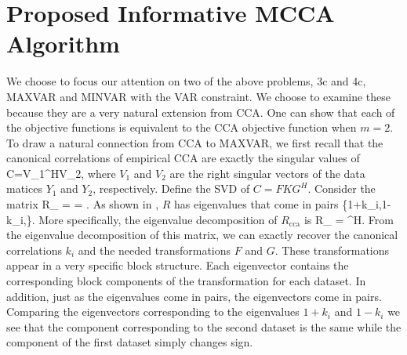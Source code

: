 \section{Proposed Informative MCCA Algorithm}

We choose to focus our attention on two of the above problems, 3c and 4c, MAXVAR and
MINVAR with the VAR constraint. We choose to examine these because they are a very natural
extension from CCA. One can show that each of the objective functions is equivalent to the
CCA objective function when $m=2$. To draw a natural connection from CCA to MAXVAR, we
first recall that the canonical correlations of empirical CCA are exactly the singular
values of 
\beq\label{eq:chpt10:C_cca}
C=V_1^HV_2,
\eeq
where $V_1$ and $V_2$ are the right singular vectors of the data matices $Y_1$ and $Y_2$,
respectively. Define the SVD of $C=FKG^H$. Consider the matrix 
\beq\label{eq:chpt10:R_cca}
R_{} = \left[\begin{array}{c}V_1^H\\V_2^H\end{array}\right]\left[\begin{array}{cc}V_1 &
    V_2\end{array}\right] = \left[\begin{array}{cc}I_{d_1} &
    V_1^HV_2\\ V_2^HV_1 & I_{d_2}\end{array}\right].
\eeq
As shown in \cite{bach2003kernel}, $R$ has eigenvalues that come in pairs
\be
\left\{1+k_i,1-k_i,\right\}.
\ee
More specifically, the eigenvalue decomposition of $R_{\text{cca}}$ is
\be
R_{} = \left[\begin{array}{cc}F & -F\\ G & G\end{array}\right]
\left[\begin{array}{cc}F & -F\\ G & G\end{array}\right]^H.
\ee
From the eigenvalue decomposition of this matrix, we can exactly recover the canonical
correlations $k_i$ and the needed transformations $F$ and $G$. These transformations appear
in a very specific block structure. Each eigenvector contains the corresponding block
components of the transformation for each dataset. In addition, just as the eigenvalues come in pairs, the
eigenvectors come in pairs. Comparing the eigenvectors corresponding to the eigenvalues
$1+k_i$ and $1-k_i$ we see that the component corresponding to the second dataset is the
same while the component of the first dataset simply changes sign. 

